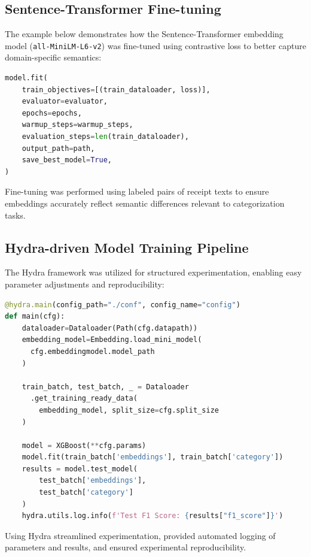 \documentclass{SGGW-thesis-EN}
\begin{document}
\subsection{Sentence-Transformer Fine-tuning}

The example below demonstrates how the Sentence-Transformer embedding model (\texttt{all-MiniLM-L6-v2}) was fine-tuned using contrastive loss to better capture domain-specific semantics:

\begin{lstlisting}[language=Python, caption={Fine-tuning Sentence-Transformer embeddings}, label={lst:embedding_finetuning}]
model.fit(
    train_objectives=[(train_dataloader, loss)],
    evaluator=evaluator,
    epochs=epochs,
    warmup_steps=warmup_steps,
    evaluation_steps=len(train_dataloader),
    output_path=path,
    save_best_model=True,
)
\end{lstlisting}
\label{code:finetuning_example}
\noindent Fine-tuning was performed using labeled pairs of receipt texts to ensure embeddings accurately reflect semantic differences relevant to categorization tasks.

\subsection{Hydra-driven Model Training Pipeline}

The Hydra framework was utilized for structured experimentation, enabling easy parameter adjustments and reproducibility:


\begin{lstlisting}[language=Python, caption={Training pipeline}, label={lst:preprocessing}]
@hydra.main(config_path="./conf", config_name="config")
def main(cfg):
    dataloader=Dataloader(Path(cfg.datapath))
    embedding_model=Embedding.load_mini_model(
      cfg.embeddingmodel.model_path
    )

    train_batch, test_batch, _ = Dataloader
      .get_training_ready_data(
        embedding_model, split_size=cfg.split_size
    )

    model = XGBoost(**cfg.params)
    model.fit(train_batch['embeddings'], train_batch['category'])
    results = model.test_model(
        test_batch['embeddings'], 
        test_batch['category']
    )
    hydra.utils.log.info(f'Test F1 Score: {results["f1_score"]}')
\end{lstlisting}
\label{code:hydra_pipeline_example}
\noindent Using Hydra streamlined experimentation, provided automated logging of parameters and results, and ensured experimental reproducibility.
\end{document}
